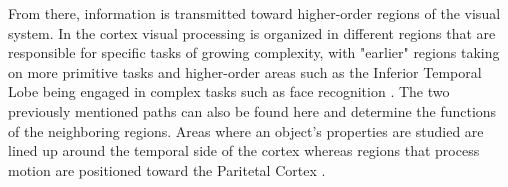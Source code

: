 From there, information is transmitted toward higher-order regions of the visual system. In the cortex visual processing is organized in different regions that are responsible for specific tasks of growing complexity, with "earlier" regions taking on more primitive tasks and higher-order areas such as the Inferior Temporal Lobe being engaged in complex tasks such as face recognition \parencite{sugase2011role}. The two previously mentioned paths can also be found here and determine the functions of the neighboring regions. Areas where an object's properties are studied are lined up around the temporal side of the cortex whereas regions that process motion are positioned toward the Paritetal Cortex \parencite{gegenfurtner1996interaction, niebur1995control}.




